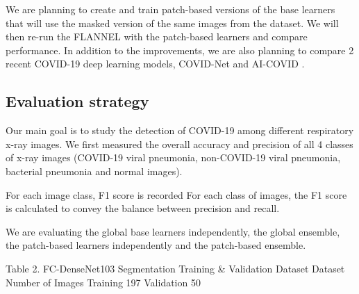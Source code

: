 \documentclass{sigkddExp}
\begin{document}
We are planning to create and train patch-based versions of the base learners
that will use the masked version of the same images from the dataset. We will
then re-run the FLANNEL with the patch-based learners and compare performance.
In addition to the improvements, we are  also planning to compare 2 recent
COVID-19 deep learning models, COVID-Net \cite{wang2020covidnet} and AI-COVID
\cite{pmid32339081}.


\subsection{Evaluation strategy}
Our main goal is to study the detection of COVID-19 among different respiratory
x-ray images. We first measured the overall accuracy and precision of all 4
classes of x-ray images (COVID-19 viral pneumonia, non-COVID-19 viral pneumonia,
bacterial pneumonia and normal images).

For each image class, F1 score is recorded For each class of images, the F1
score is calculated to convey the balance between precision and recall.

We are evaluating the global base learners independently, the global ensemble,
the patch-based learners independently and the patch-based ensemble.



Table 2. FC-DenseNet103 Segmentation Training \& Validation Dataset Dataset
Number of Images Training 197 Validation 50
\end{document}
